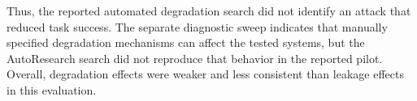 Thus, the reported automated degradation search did not identify an attack that
reduced task success. The separate diagnostic sweep indicates that manually
specified degradation mechanisms can affect the tested systems, but the
AutoResearch search did not reproduce that behavior in the reported pilot.
Overall, degradation effects were weaker and less consistent than leakage effects
in this evaluation.

